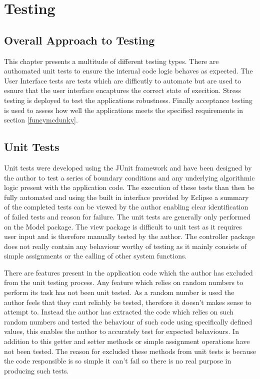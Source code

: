 \chapter{Testing}

\section{Overall Approach to Testing}

This chapter presents a multitude of different testing types. There are authomated unit tests to ensure the internal code logic behaves as expected. The User Interface tests are tests which are difficutly to automate but are used to esnure that the user interface encaptures the correct state of execition. Stress testing is deployed to test the applications robustness. Finally acceptance testing is used to assess how well the applications meets the specified requirements in section \ref{funcymcdunky}.

\section{Unit Tests}

Unit tests were developed using the JUnit framework and have been designed by the author to test a series of boundary conditions and any underlying algorithmic logic present with the application code. The execution of these tests than then be fully automated and using the built in interface provided by Eclipse a summary of the completed tests can be viewed by the author enabling clear identification of failed tests and reason for failure. The unit tests are generally only performed on the Model package. The view package is difficult to unit test as it requires user input and is therefore manually tested by the author. The controller package does not really contain any behaviour worthy of testing as it mainly consists of simple assignments or the calling of other system functions.

There are features present in the application code which the author has excluded from the unit testing process. Any feature which relies on random numbers to perform its task has not been unit tested. As a random number is used the author feels that they cant reliably be tested, therefore it doesn’t makes sense to attempt to. Instead the author has extracted the code which relies on such random numbers and tested the behaviour of such code using specifically defined values, this enables the author to accurately test for expected behaviours. In addition to this getter and setter methods or simple assignment operations have not been tested. The reason for excluded these methods from unit tests is because the code responsible is so simple it can’t fail so there is no real purpose in producing such tests.

